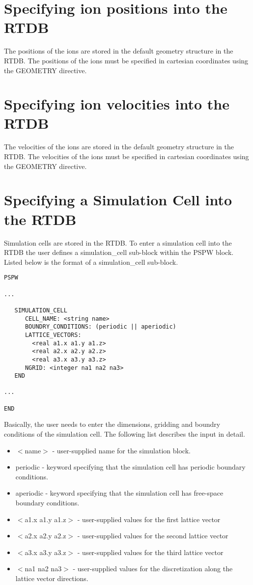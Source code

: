 \section{Specifying ion positions into the RTDB}

The positions of the ions are stored in the default geometry structure
in the RTDB.  
The positions of the ions must be specified in cartesian coordinates
using the GEOMETRY directive.

\section{Specifying ion velocities into the RTDB}

The velocities of the ions are stored in the default geometry structure
in the RTDB.
The velocities of the ions must be specified in cartesian coordinates
using the GEOMETRY directive.


\section{Specifying a Simulation Cell into the RTDB}

Simulation cells are stored in the RTDB.  To enter a  simulation cell
into the RTDB the user defines a simulation\_cell sub-block within the PSPW 
block.  Listed below is the format of a simulation\_cell sub-block.
\begin{verbatim}
PSPW

...

   SIMULATION_CELL
      CELL_NAME: <string name>
      BOUNDRY_CONDITIONS: (periodic || aperiodic)
      LATTICE_VECTORS:
        <real a1.x a1.y a1.z>
        <real a2.x a2.y a2.z>
        <real a3.x a3.y a3.z>
      NGRID: <integer na1 na2 na3>
   END

...

END
\end{verbatim}
Basically, the user needs to enter the dimensions, gridding and boundry
conditions of the simulation cell.  The following list describes the 
input in detail.
\begin{itemize}
	\item $<$name$>$ - user-supplied name for the simulation block.
	\item periodic - keyword specifying that the simulation cell 
	                 has periodic boundary conditions. 	
	\item aperiodic - keyword specifying that the simulation cell
		          has free-space boundary conditions.
	\item $<$a1.x a1.y a1.z$>$ - user-supplied values for the first lattice 
				 vector 
	\item $<$a2.x a2.y a2.z$>$ - user-supplied values for the second lattice
				 vector
	\item $<$a3.x a3.y a3.z$>$ - user-supplied values for the third lattice
			  	 vector
	\item $<$na1 na2 na3$>$ - user-supplied values for the discretization along
			      the lattice vector directions.
\end{itemize}



